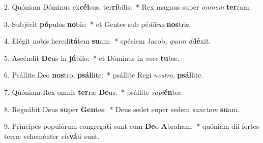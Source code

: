 2. Quóniam Dóminus ex\textbf{cél}sus, ter\textbf{rí}bilis:~*  Rex magnus super \textit{om}\textit{nem} \textbf{ter}ram.\

3. Subjécit \textbf{pó}pulos \textbf{no}bis:~*  et Gentes sub pé\textit{di}\textit{bus} \textbf{nos}tris.\

4. Elégit nobis heredi\textbf{tá}tem \textbf{su}am:~*  spéciem Jacob, \textit{quam} \textit{di}\textbf{lé}xit.\

5. Ascéndit \textbf{De}us in \textbf{jú}bilo:~*  et Dóminus in \textit{vo}\textit{ce} \textbf{tu}bæ.\

6. Psállite Deo \textbf{nos}tro, \textbf{psál}lite:~*  psállite Regi \textit{nos}\textit{tro}, \textbf{psál}lite.\

7. Quóniam Rex omnis \textbf{ter}ræ \textbf{De}us:~*  psállite \textit{sa}\textit{pi}\textbf{én}ter.\

8. Regnábit Deus \textbf{su}per \textbf{Gen}tes:~*  Deus sedet super sedem \textit{sanc}\textit{tam} \textbf{su}am.\

9. Príncipes populórum congregáti sunt cum \textbf{De}o \textbf{A}braham:~*  quóniam dii fortes terræ veheménter \textit{e}\textit{le}\textbf{vá}ti sunt.\

